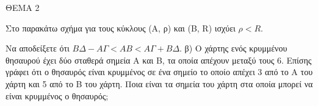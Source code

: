 
ΘΕΜΑ 2

\begin{alist}
\item Στο παρακάτω σχήμα για τους κύκλους (Α, ρ) και (Β, R) ισχύει $\rho < R$.



Να αποδείξετε ότι $Β\Delta - Α\Gamma < ΑΒ < Α\Gamma + Β\Delta$.  β) Ο χάρτης ενός κρυμμένου θησαυρού έχει δύο σταθερά σημεία Α και Β, τα οποία απέχουν μεταξύ τους 6. Επίσης γράφει ότι ο θησαυρός είναι κρυμμένος σε ένα σημείο το οποίο απέχει 3 από το Α του χάρτη και 5 από το Β του χάρτη. Ποια είναι τα σημεία του χάρτη στα οποία μπορεί να είναι κρυμμένος ο θησαυρός;

\end{alist}
